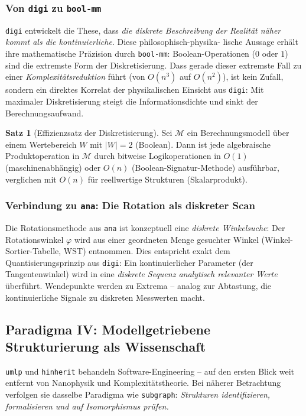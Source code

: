 ﻿\documentclass[a4paper,12pt]{scrreprt}
\theoremstyle{definition}
\newtheorem{satz}{Satz}[section]
\begin{document}
\subsubsection{Von \texttt{digi} zu \texttt{bool-mm}}

\texttt{digi} entwickelt die These, dass \emph{die diskrete Beschreibung
der Realität näher kommt als die kontinuierliche}. Diese philosophisch-physika-
lische Aussage erhält ihre mathematische Präzision durch \texttt{bool-mm}:
Boolean-Operationen ($0$ oder $1$) sind die extremste Form der Diskretisierung.
Dass gerade dieser extremste Fall zu einer \emph{Komplexitätsreduktion} führt
(von $O(n^3)$ auf $O(n^2)$), ist kein Zufall, sondern ein direktes
Korrelat der physikalischen Einsicht aus \texttt{digi}: Mit maximaler Diskretisierung
steigt die Informationsdichte und sinkt der Berechnungsaufwand.

\begin{satz}[Effizienzsatz der Diskretisierung]
  Sei $\mathcal{M}$ ein Berechnungsmodell über einem Wertebereich $W$ mit
  $|W|=2$ (Boolean). Dann ist jede algebraische Produktoperation in $\mathcal{M}$
  durch bitweise Logikoperationen in $O(1)$ (maschinenabhängig) oder $O(n)$
  (Boolean-Signatur-Methode) ausführbar, verglichen mit $O(n)$ für reellwertige
  Strukturen (Skalarprodukt).
\end{satz}

\subsubsection{Verbindung zu \texttt{ana}: Die Rotation als diskreter Scan}

Die Rotationsmethode aus \texttt{ana} ist konzeptuell eine \emph{diskrete
Winkelsuche}: Der Rotationswinkel $\varphi$ wird aus einer geordneten Menge
gesuchter Winkel (Winkel-Sortier-Tabelle, WST) entnommen. Dies entspricht
exakt dem Quantisierungsprinzip aus \texttt{digi}: Ein kontinuierlicher
Parameter (der Tangentenwinkel) wird in eine \emph{diskrete Sequenz
analytisch relevanter Werte} überführt. Wendepunkte werden zu Extrema --
analog zur Abtastung, die kontinuierliche Signale zu diskreten Messwerten macht.

\subsection{Paradigma IV: Modellgetriebene Strukturierung als Wissenschaft}
\label{ssec:paradigma4}

\texttt{umlp} und \texttt{hinherit} behandeln Software-Engineering -- auf
den ersten Blick weit entfernt von Nanophysik und Komplexitätstheorie.
Bei näherer Betrachtung verfolgen sie dasselbe Paradigma wie \texttt{subgraph}:
\emph{Strukturen identifizieren, formalisieren und auf Isomorphismus prüfen.}
\end{document}
